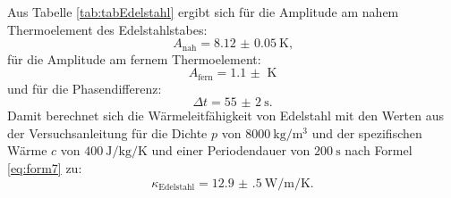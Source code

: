 Aus Tabelle \ref{tab:tabEdelstahl} ergibt sich für die Amplitude am nahem Thermoelement des Edelstahlstabes:
\begin{displaymath}
A_\text{nah} = \SI{8.12(5)}{\kelvin}\text{,}
\end{displaymath}
für die Amplitude am fernem Thermoelement:
\begin{displaymath}
A_\text{fern} = \SI{1.1(0)}{\kelvin}
\end{displaymath}
und für die Phasendifferenz:
\begin{displaymath}
\Delta t = \SI{55(2)}{\second}\text{.}
\end{displaymath}
Damit berechnet sich die Wärmeleitfähigkeit von Edelstahl mit den Werten aus der Versuchsanleitung \cite{V204} für die Dichte $p$ von $\SI{8000}{\kilo\gram\per\meter\tothe{3}}$ und der spezifischen Wärme $c$ von $\SI{400}{\joule\per\kilo\gram\per\kelvin}$ und einer Periodendauer von $\SI{200}{\second}$ nach Formel \eqref{eq:form7} zu:
\begin{displaymath}
\kappa_\text{Edelstahl} = \SI{12.9(5)}{\watt\per\meter\per\kelvin}\text{.}
\end{displaymath}